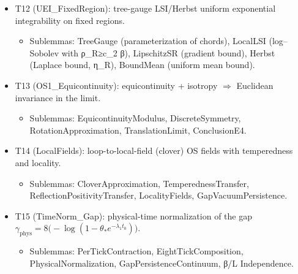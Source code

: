 \documentclass[11pt]{amsart}
\begin{document}
\begin{itemize}
\begin{itemize}
  \end{itemize}
  \item T12 (UEI\_FixedRegion): tree-gauge LSI/Herbst uniform exponential integrability on fixed regions.
  \begin{itemize}
    \item Sublemmas: TreeGauge (parameterization of chords), LocalLSI (log–Sobolev with ρ_R≥c_2 β), LipschitzSR (gradient bound), Herbst (Laplace bound, η_R), BoundMean (uniform mean bound).
  \end{itemize}
  \item T13 (OS1\_Equicontinuity): equicontinuity + isotropy $\Rightarrow$ Euclidean invariance in the limit.
  \begin{itemize}
    \item Sublemmas: EquicontinuityModulus, DiscreteSymmetry, RotationApproximation, TranslationLimit, ConclusionE4.
  \end{itemize}
  \item T14 (LocalFields): loop-to-local-field (clover) OS fields with temperedness and locality.
  \begin{itemize}
    \item Sublemmas: CloverApproximation, TemperednessTransfer, ReflectionPositivityTransfer, LocalityFields, GapVacuumPersistence.
  \end{itemize}
  \item T15 (TimeNorm\_Gap): physical-time normalization of the gap $\gamma_{\mathrm{phys}}=8\big(-\log(1-\theta_* e^{-\lambda_1 t_0})\big)$.
  \begin{itemize}
    \item Sublemmas: PerTickContraction, EightTickComposition, PhysicalNormalization, GapPersistenceContinuum, β/L Independence.
  \end{itemize}
\end{itemize}
\end{document}
